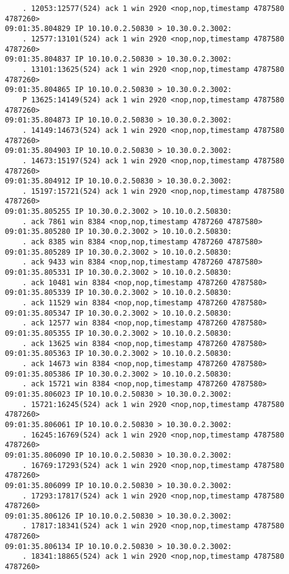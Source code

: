 \documentclass[a4paper,12pt]{article}
\begin{document}
\begin{Verbatim}
    . 12053:12577(524) ack 1 win 2920 <nop,nop,timestamp 4787580 4787260>
09:01:35.804829 IP 10.10.0.2.50830 > 10.30.0.2.3002: 
    . 12577:13101(524) ack 1 win 2920 <nop,nop,timestamp 4787580 4787260>
09:01:35.804837 IP 10.10.0.2.50830 > 10.30.0.2.3002: 
    . 13101:13625(524) ack 1 win 2920 <nop,nop,timestamp 4787580 4787260>
09:01:35.804865 IP 10.10.0.2.50830 > 10.30.0.2.3002: 
    P 13625:14149(524) ack 1 win 2920 <nop,nop,timestamp 4787580 4787260>
09:01:35.804873 IP 10.10.0.2.50830 > 10.30.0.2.3002: 
    . 14149:14673(524) ack 1 win 2920 <nop,nop,timestamp 4787580 4787260>
09:01:35.804903 IP 10.10.0.2.50830 > 10.30.0.2.3002: 
    . 14673:15197(524) ack 1 win 2920 <nop,nop,timestamp 4787580 4787260>
09:01:35.804912 IP 10.10.0.2.50830 > 10.30.0.2.3002: 
    . 15197:15721(524) ack 1 win 2920 <nop,nop,timestamp 4787580 4787260>
09:01:35.805255 IP 10.30.0.2.3002 > 10.10.0.2.50830: 
    . ack 7861 win 8384 <nop,nop,timestamp 4787260 4787580>
09:01:35.805280 IP 10.30.0.2.3002 > 10.10.0.2.50830: 
    . ack 8385 win 8384 <nop,nop,timestamp 4787260 4787580>
09:01:35.805289 IP 10.30.0.2.3002 > 10.10.0.2.50830: 
    . ack 9433 win 8384 <nop,nop,timestamp 4787260 4787580>
09:01:35.805331 IP 10.30.0.2.3002 > 10.10.0.2.50830: 
    . ack 10481 win 8384 <nop,nop,timestamp 4787260 4787580>
09:01:35.805339 IP 10.30.0.2.3002 > 10.10.0.2.50830: 
    . ack 11529 win 8384 <nop,nop,timestamp 4787260 4787580>
09:01:35.805347 IP 10.30.0.2.3002 > 10.10.0.2.50830: 
    . ack 12577 win 8384 <nop,nop,timestamp 4787260 4787580>
09:01:35.805355 IP 10.30.0.2.3002 > 10.10.0.2.50830: 
    . ack 13625 win 8384 <nop,nop,timestamp 4787260 4787580>
09:01:35.805363 IP 10.30.0.2.3002 > 10.10.0.2.50830: 
    . ack 14673 win 8384 <nop,nop,timestamp 4787260 4787580>
09:01:35.805386 IP 10.30.0.2.3002 > 10.10.0.2.50830: 
    . ack 15721 win 8384 <nop,nop,timestamp 4787260 4787580>
09:01:35.806023 IP 10.10.0.2.50830 > 10.30.0.2.3002: 
    . 15721:16245(524) ack 1 win 2920 <nop,nop,timestamp 4787580 4787260>
09:01:35.806061 IP 10.10.0.2.50830 > 10.30.0.2.3002: 
    . 16245:16769(524) ack 1 win 2920 <nop,nop,timestamp 4787580 4787260>
09:01:35.806090 IP 10.10.0.2.50830 > 10.30.0.2.3002: 
    . 16769:17293(524) ack 1 win 2920 <nop,nop,timestamp 4787580 4787260>
09:01:35.806099 IP 10.10.0.2.50830 > 10.30.0.2.3002: 
    . 17293:17817(524) ack 1 win 2920 <nop,nop,timestamp 4787580 4787260>
09:01:35.806126 IP 10.10.0.2.50830 > 10.30.0.2.3002: 
    . 17817:18341(524) ack 1 win 2920 <nop,nop,timestamp 4787580 4787260>
09:01:35.806134 IP 10.10.0.2.50830 > 10.30.0.2.3002: 
    . 18341:18865(524) ack 1 win 2920 <nop,nop,timestamp 4787580 4787260>

\end{Verbatim}
\end{document}
